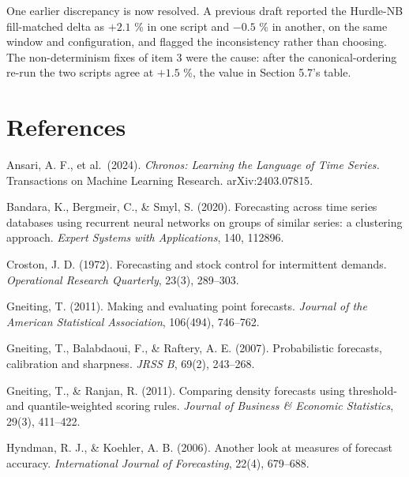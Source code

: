 \documentclass[11pt]{article}
\begin{document}
One earlier discrepancy is now resolved. A previous draft reported the
Hurdle-NB fill-matched delta as $+2.1$ \% in one script and $-0.5$ \% in
another, on the same window and configuration, and flagged the inconsistency
rather than choosing. The non-determinism fixes of item 3 were the cause:
after the canonical-ordering re-run the two scripts agree at $+1.5$ \%, the
value in Section 5.7's table.

\section*{References}

\begin{list}{}{%
  \setlength{\leftmargin}{1.5em}%
  \setlength{\itemindent}{-1.5em}%
  \setlength{\itemsep}{4pt}%
  \setlength{\parsep}{0pt}}

\item Ansari, A. F., et al.\ (2024). \emph{Chronos: Learning the Language of
Time Series.} Transactions on Machine Learning Research. arXiv:2403.07815.

\item Bandara, K., Bergmeir, C., \& Smyl, S. (2020). Forecasting across time
series databases using recurrent neural networks on groups of similar series: a
clustering approach. \emph{Expert Systems with Applications}, 140, 112896.

\item Croston, J. D. (1972). Forecasting and stock control for intermittent
demands. \emph{Operational Research Quarterly}, 23(3), 289--303.

\item Gneiting, T. (2011). Making and evaluating point forecasts.
\emph{Journal of the American Statistical Association}, 106(494), 746--762.

\item Gneiting, T., Balabdaoui, F., \& Raftery, A. E. (2007). Probabilistic
forecasts, calibration and sharpness. \emph{JRSS B}, 69(2), 243--268.

\item Gneiting, T., \& Ranjan, R. (2011). Comparing density forecasts using
threshold- and quantile-weighted scoring rules. \emph{Journal of Business \&
Economic Statistics}, 29(3), 411--422.

\item Hyndman, R. J., \& Koehler, A. B. (2006). Another look at measures of
forecast accuracy. \emph{International Journal of Forecasting}, 22(4),
679--688.


\end{list}
\end{document}
